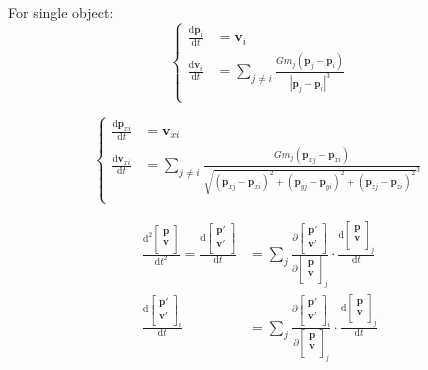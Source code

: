 \documentclass[12pt,letterpaper]{article}
\newcommand{\vep}{\bm{p}}
\newcommand{\vev}{\bm{v}}
\newcommand{\der}[2]{\frac{\text{d} #1}{\text{d} #2}}
\newcommand{\ders}[2]{\frac{\text{d}^2 #1}{{\text{d} #2}^2}}
\newcommand{\pard}[2]{\frac{\partial #1}{\partial #2}}
\begin{document}
    For single object:
    \[
    \begin{cases}
        \der{\vep_i}{t}&=\vev_i \\
        \der{\vev_i}{t}&=\sum_{j\neq i}\frac{Gm_j(\vep_j-\vep_i)}{|\vep_j-\vep_i|^3} \\
    \end{cases}
    \]

    \[
    \begin{cases}
        \der{\vep_{xi}}{t}&=\vev_{xi}\\
        \der{\vev_{xi}}{t}&=\sum_{j\neq i}\frac{Gm_j(\vep_{xj}-\vep_{xi})}{\sqrt{(\vep_{xj}-\vep_{xi})^2+(\vep_{yj}-\vep_{yi})^2+(\vep_{zj}-\vep_{zi})^2}^3} \\
    \end{cases}
    \]

    \begin{align*}
        \ders{\left[\begin{matrix}\vep\\\vev\\\end{matrix}\right]}{t}
        =\der{\left[\begin{matrix}\vep'\\\vev'\\\end{matrix}\right]}{t}
        &=\sum_{j}\pard{\left[\begin{matrix}\vep'\\\vev'\\\end{matrix}\right]}{\left[\begin{matrix}\vep\\\vev\\\end{matrix}\right]_j} \cdot \der{\left[\begin{matrix}\vep\\\vev\\\end{matrix}\right]_j}{t}\\
        \der{\left[\begin{matrix}\vep'\\\vev'\\\end{matrix}\right]_i}{t}
        &=\sum_{j}\pard{\left[\begin{matrix}\vep'\\\vev'\\\end{matrix}\right]_i}{\left[\begin{matrix}\vep\\\vev\\\end{matrix}\right]_j} \cdot \der{\left[\begin{matrix}\vep\\\vev\\\end{matrix}\right]_j}{t}\\
    \end{align*}
\end{document}
